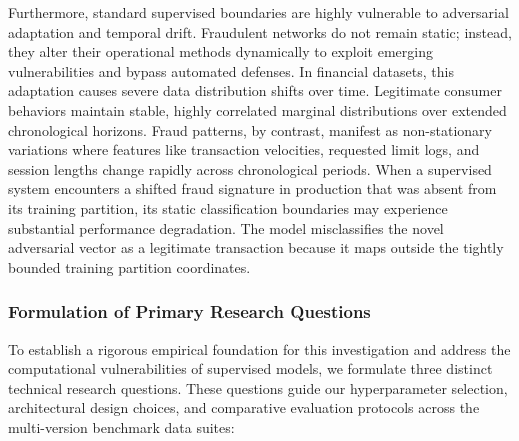 Furthermore, standard supervised boundaries are highly vulnerable to adversarial adaptation and temporal drift. Fraudulent networks do not remain static; instead, they alter their operational methods dynamically to exploit emerging vulnerabilities and bypass automated defenses. In financial datasets, this adaptation causes severe data distribution shifts over time. Legitimate consumer behaviors maintain stable, highly correlated marginal distributions over extended chronological horizons. Fraud patterns, by contrast, manifest as non-stationary variations where features like transaction velocities, requested limit logs, and session lengths change rapidly across chronological periods. When a supervised system encounters a shifted fraud signature in production that was absent from its training partition, its static classification boundaries may experience substantial performance degradation. The model misclassifies the novel adversarial vector as a legitimate transaction because it maps outside the tightly bounded training partition coordinates.

\subsubsection{Formulation of Primary Research Questions}

To establish a rigorous empirical foundation for this investigation and address the computational vulnerabilities of supervised models, we formulate three distinct technical research questions. These questions guide our hyperparameter selection, architectural design choices, and comparative evaluation protocols across the multi-version benchmark data suites:

